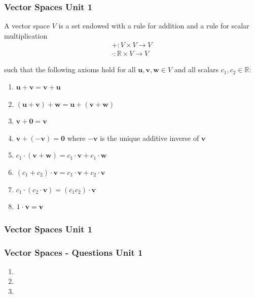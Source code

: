 \documentclass[12pt]{beamer}
\newcommand{\FrameTitle}[2]{\frametitle{#1 \hfill \small\textnormal{\textcolor{midgray}{#2}}}}
\newcommand{\vsp}{\vspace*{1em}}
\newcommand{\Vector}[1]{\textbf{#1}}
\newcommand{\Scalar}[1]{\textnormal{#1}}
\begin{document}
\begin{frame}\FrameTitle{Vector Spaces}{Unit 1}
A vector space $V$ is a set endowed with a rule for addition and a
rule for scalar multiplication
    \begin{align*}
        +: V \times V \rightarrow V \\
        \cdot: \mathbb{R} \times V \rightarrow V
    \end{align*}

such that the following axioms hold for all $\Vector{u}, \Vector{v}, \Vector{w} \in V$ and all scalars $c_{1}, c_{2} \in \mathbb{R}$:
    \begin{enumerate}
        \item $\Vector{u} + \Vector{v} = \Vector{v} + \Vector{u}$
        \item $(\Vector{u} + \Vector{v}) + \Vector{w} = \Vector{u} + (\Vector{v} + \Vector{w})$
        \item $\Vector{v} + \Vector{0} = \Vector{v}$
        \item $\Vector{v} + (-\Vector{v}) = \mathbf{0}$ where $-\Vector{v}$ is the unique additive inverse of $\Vector{v}$
        \item $c_1 \cdot (\Vector{v} + \Vector{w}) = c_1 \cdot \Vector{v} + c_1 \cdot \Vector{w}$
        \item $(c_1 + c_2) \cdot \Vector{v} = c_1 \cdot \Vector{v} + c_2\cdot \Vector{v}$
        \item $c_1 \cdot (c_2 \cdot \Vector{v}) = (c_1 c_2) \cdot \Vector{v}$
        \item $\Scalar{1} \cdot \Vector{v} = \Vector{v}$
    \end{enumerate}
\end{frame}

\begin{frame}\FrameTitle{Vector Spaces}{Unit 1}
    {}
\end{frame}

\begin{frame}\FrameTitle{Vector Spaces - Questions}{Unit 1}
    \vsp
    \begin{enumerate}
        \item {}
        \item {}
        \item {}
    \end{enumerate}
\end{frame}
\end{document}
